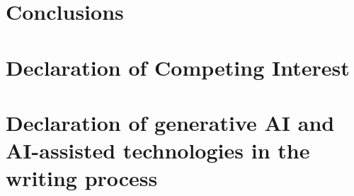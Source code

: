 \begin{linenumbers}
\section{Conclusions}
\label{sec:Conclusion}



\section{Declaration of Competing Interest}
\label{sec:DeclarationInterest}


\section{Declaration of generative AI and AI-assisted technologies in the writing process}
\label{sec:Declaration AI}


\end{linenumbers}

